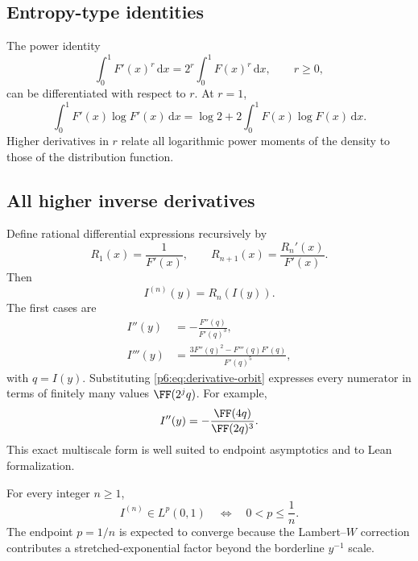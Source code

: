 \documentclass[11pt,oneside]{article}
\theoremstyle{definition}
\theoremstyle{remark}
\newcommand{\dd}{\,\mathrm d}
\newcommand{\1}{\mathbf 1}
\begin{document}
\subsection{Entropy-type identities}

The power identity
\begin{equation}
 \int_0^1F'(x)^r\dd x=2^r\int_0^1F(x)^r\dd x,
 \qquad r\ge0,                                            \label{p6:eq:Fprime-power}
\end{equation}
can be differentiated with respect to \(r\).  At \(r=1\),
\begin{equation}
 \int_0^1F'(x)\log F'(x)\dd x
 =\log2+2\int_0^1F(x)\log F(x)\dd x.                    \label{p6:eq:entropy-identity}
\end{equation}
Higher derivatives in \(r\) relate all logarithmic power moments of the density to those
of the distribution function.

\subsection{All higher inverse derivatives}

Define rational differential expressions recursively by
\begin{equation}
 R_1(x)=\frac1{F'(x)},\qquad
 R_{n+1}(x)=\frac{R_n'(x)}{F'(x)}.                         \label{p6:eq:inverse-derivative-recursion}
\end{equation}
Then
\begin{equation}
 I^{(n)}(y)=R_n(I(y)).                                     \label{p6:eq:inverse-derivative-all}
\end{equation}
The first cases are
\begin{align}
 I''(y)&=-\frac{F''(q)}{F'(q)^3},                          \label{p6:eq:Isecond}\\
 I'''(y)&=\frac{3F''(q)^2-F'''(q)F'(q)}{F'(q)^5},          \label{p6:eq:Ithird}
\end{align}
with \(q=I(y)\).  Substituting \eqref{p6:eq:derivative-orbit} expresses every numerator
in terms of finitely many values \(\FF(2^jq)\).  For example,
\begin{equation}
 I''(y)=-\frac{\FF(4q)}{\FF(2q)^3}.                       \label{p6:eq:Isecond-scaled}
\end{equation}
This exact multiscale form is well suited to endpoint asymptotics and to Lean
formalization.

\begin{conjecture}
\label{p6:conj:higher-inverse-Lp}
For every integer \(n\ge1\),
\begin{equation}
 I^{(n)}\in L^p(0,1)
 \quad\Longleftrightarrow\quad 0<p\le\frac1n.             \label{p6:eq:higher-I-threshold}
\end{equation}
The endpoint \(p=1/n\) is expected to converge because the Lambert--\(W\) correction
contributes a stretched-exponential factor beyond the borderline \(y^{-1}\) scale.
\end{conjecture}
\end{document}
